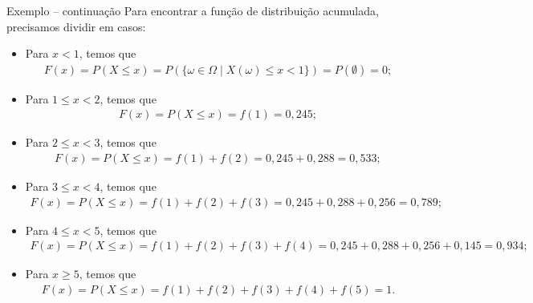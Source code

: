 \documentclass[9pt]{beamer}
\begin{document}
\begin{frame}{Exemplo -- continuação}
Para encontrar a função de distribuição acumulada, precisamos dividir em casos:

{\scriptsize
  \begin{itemize}
   \item Para $x <1$, temos que 
   \begin{align*}
    F(x) = P(X \leq x) = P\left( \{\omega \in \Omega \mid X(\omega) \leq x <1 \} \right) = P(\emptyset) = 0; 
   \end{align*}
   \item Para $1 \leq x < 2$, temos que
   \begin{align*}
    F(x) = P(X \leq x) = f(1) = 0,245;
   \end{align*}
   \item Para $2 \leq x < 3$, temos que
   \begin{align*}
    F(x) = P(X \leq x) = f(1)+f(2) = 0,245+0,288 = 0,533;
   \end{align*}
   \item Para $3 \leq x < 4$, temos que
   \begin{align*}
    F(x) = P(X \leq x) = f(1)+f(2)+f(3) = 0,245+0,288+0,256 = 0,789;
   \end{align*}
   \item Para $4 \leq x < 5$, temos que
   \begin{align*}
    F(x) = P(X \leq x) = f(1)+f(2)+f(3)+f(4) = 0,245+0,288+0,256+0,145 = 0,934;
   \end{align*}
   \item Para $x \geq 5$, temos que
   \begin{align*}
    F(x) = P(X \leq x) = f(1)+f(2)+f(3)+f(4)+f(5) = 1.
   \end{align*}
  \end{itemize}
} 

\def \array{{0.245, 0.533, 0.789, 0.934,1}}
  \begin{figure}
   \centering
  \end{figure}

\end{frame}
\end{document}
